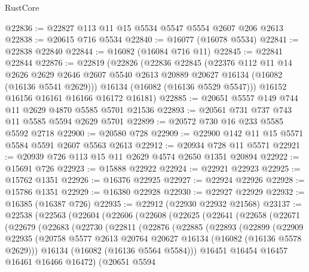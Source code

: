\begin{lexlean}{RustCore}
\begin{coremodule}
@22836 := @22827 @113 @11 @15 @5534 @5547 @5554 @2607 @206 @2613
@22838 := @20615 @716 @5534
@22840 := @16077 (@16078 @5534)
@22841 := @22838 @22840
@22844 := @16082 (@16084 @716 @11)
@22845 := @22841 @22844
@22876 := @22819
    (@22826
      (@22836
        @22845
        (@22376
          @112
          @11
          @14
          @2626
          @2629
          @2646
          @2607
          @5540
          @2613
          @20889
          @20627
          @16134
          (@16082 (@16136 @5541 @2629)))
        @16134
        (@16082 (@16136 @5529 @5547)))
      @16152
      @16156
      @16161
      @16166
      @16172
      @16181)
@22885 := @20651 @5557 @149 @744 @11 @2629 @4870 @5585 @5701 @21536
@22893 := @20561 @731 @737 @743 @11 @5585 @5594 @2629 @5701
@22899 := @20572 @730 @16 @233 @5585 @5592 @2718
@22900 := @20580 @728
@22909 := @22900 @142 @11 @15 @5571 @5584 @5591 @2607 @5563 @2613
@22912 := @20934 @728 @11 @5571
@22921 := @20939 @726 @113 @15 @11 @2629 @4574 @2650 @1351 @20894
@22922 := @15691 @726
@22923 := @15888 @22922
@22924 := @22921 @22923
@22925 := @15762 @1351
@22926 := @16376 @22925
@22927 := @22924 @22926
@22928 := @15786 @1351
@22929 := @16380 @22928
@22930 := @22927 @22929
@22932 := @16385 (@16387 @726)
@22935 := @22912 (@22930 @22932 @21568)
@23137 := @22538
    (@22563
      (@22604
        (@22606
          (@22608
            (@22625
              (@22641
                (@22658
                  (@22671
                    (@22679
                      (@22683
                        (@22730
                          (@22811
                            (@22876
                              (@22885
                                (@22893
                                  (@22899
                                    (@22909
                                      @22935
                                      (@20758
                                        @5577
                                        @2613
                                        @20764
                                        @20627
                                        @16134
                                        (@16082 (@16136 @5578 @2629)))
                                      @16134
                                      (@16082 (@16136 @5564 @5584)))
                                    @16451
                                    @16454
                                    @16457
                                    @16461
                                    @16466
                                    @16472)
                                  (@20651
                                    @5594

\end{coremodule}
\end{lexlean}

